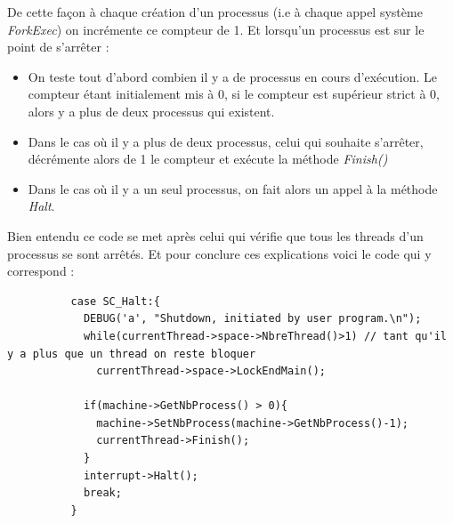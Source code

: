 \documentclass[a4paper,10pt]{article}
\begin{document}
  De cette façon à chaque création d'un processus (i.e à chaque appel système \emph{ForkExec}) on incrémente ce compteur de 1. Et lorsqu'un processus est 
  sur le point de s'arrêter : 
  \begin{itemize}
   \item On teste tout d'abord combien il y a de processus en cours d'exécution. Le compteur étant initialement mis à 0, si le compteur est supérieur 
   strict à 0, alors y a plus de deux processus qui existent.
   \item Dans le cas où il y a plus de deux processus, celui qui souhaite s'arrêter, décrémente alors de 1 le compteur et exécute la méthode \emph{Finish()}
   \item Dans le cas où il y a un seul processus, on fait alors un appel à la méthode \emph{Halt}.
  \end{itemize}
  Bien entendu ce code se met après celui qui vérifie que tous les threads d'un processus se sont arrêtés. Et pour conclure ces explications
  voici le code qui y correspond :
  \begin{lstlisting}
          case SC_Halt:{
            DEBUG('a', "Shutdown, initiated by user program.\n");
            while(currentThread->space->NbreThread()>1) // tant qu'il y a plus que un thread on reste bloquer
              currentThread->space->LockEndMain();
            
            if(machine->GetNbProcess() > 0){
              machine->SetNbProcess(machine->GetNbProcess()-1);
              currentThread->Finish();
            }
            interrupt->Halt();
            break;
          }   
  \end{lstlisting}
\end{document}
